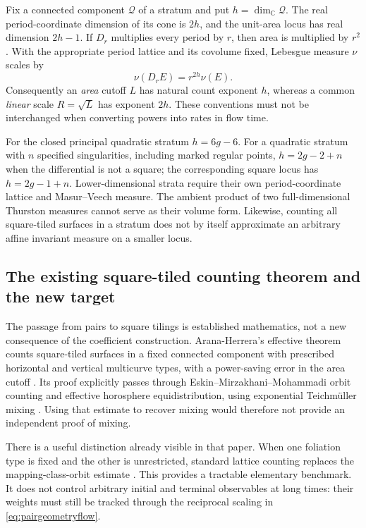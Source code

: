 \documentclass[11pt,a4paper]{article}
\numberwithin{equation}{section}
\theoremstyle{definition}
\theoremstyle{remark}
\begin{document}
Fix a connected component $\mathcal Q$ of a stratum and put
$h=\dim_{\mathbb C}\mathcal Q$.  The real period-coordinate dimension
of its cone is $2h$, and the unit-area locus has real dimension $2h-1$.
If $D_r$ multiplies every period by $r$, then area is multiplied by
$r^2$.  With the appropriate period lattice and its covolume fixed,
Lebesgue measure $\nu$ scales by
\[
 \nu(D_r E)=r^{2h}\nu(E).
\]
Consequently an \emph{area} cutoff $L$ has natural count exponent $h$,
whereas a common \emph{linear} scale $R=\sqrt L$ has exponent $2h$.
These conventions must not be interchanged when converting powers
into rates in flow time.

For the closed principal quadratic stratum $h=6g-6$.  For a
quadratic stratum with $n$ specified singularities, including marked
regular points, $h=2g-2+n$ when the differential is not a square;
the corresponding square locus has $h=2g-1+n$.
Lower-dimensional strata require their own period-coordinate lattice
and Masur--Veech measure.  The ambient product of two full-dimensional
Thurston measures cannot serve as their volume form.  Likewise,
counting all square-tiled surfaces in a stratum does not by itself
approximate an arbitrary affine invariant measure on a smaller locus.

\subsection{The existing square-tiled counting theorem and the new target}
\label{subsec:pairliterature}

The passage from pairs to square tilings is established mathematics,
not a new consequence of the coefficient construction.
Arana-Herrera's effective theorem counts square-tiled surfaces in a
fixed connected component with prescribed horizontal and vertical
multicurve types, with a power-saving error in the area cutoff
\cite[Theorem~1.1]{AranaHerreraSquareEffective}.  Its proof explicitly
passes through Eskin--Mirzakhani--Mohammadi orbit counting and effective
horosphere equidistribution, using exponential Teichm\"uller mixing
\cite[Section~3.2]{AranaHerreraSquareEffective}.
Using that estimate to recover mixing would therefore not provide an
independent proof of mixing.

There is a useful distinction already visible in that paper.
When one foliation type is fixed and the other is unrestricted,
standard lattice counting replaces the mapping-class-orbit estimate
\cite[Theorem~3.9]{AranaHerreraSquareEffective}.
This provides a tractable elementary benchmark.  It does not control
arbitrary initial and terminal observables at long times: their weights
must still be tracked through the reciprocal scaling in
\eqref{eq:pairgeometryflow}.
\end{document}

